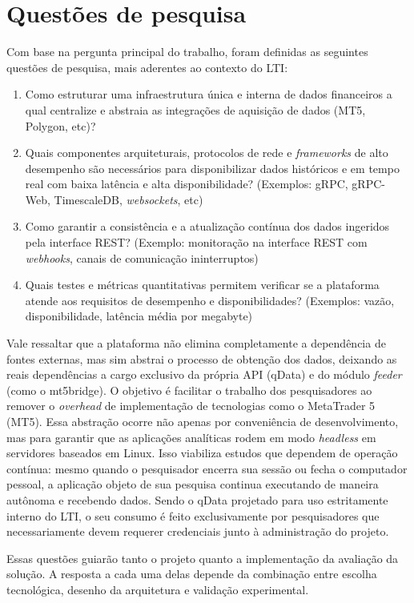 \section{Questões de pesquisa}

Com base na pergunta principal do trabalho, foram definidas as seguintes questões de pesquisa, mais aderentes ao contexto do LTI:
\begin{enumerate}
    \item Como estruturar uma infraestrutura única e interna de dados financeiros a qual centralize e abstraia as integrações de aquisição de dados (MT5, Polygon, etc)?
    \item Quais componentes arquiteturais, protocolos de rede e \textit{frameworks} de alto desempenho são necessários para disponibilizar dados históricos e em tempo real com baixa latência e alta disponibilidade? (Exemplos: gRPC, gRPC-Web, TimescaleDB, \textit{websockets}, etc)
    \item Como garantir a consistência e a atualização contínua dos dados ingeridos pela interface REST? (Exemplo: monitoração na interface REST com \textit{webhooks}, canais de comunicação ininterruptos)
    \item Quais testes e métricas quantitativas permitem verificar se a plataforma atende aos requisitos de desempenho e disponibilidades? (Exemplos: vazão, disponibilidade, latência média por megabyte)
\end{enumerate}

Vale ressaltar que a plataforma não elimina completamente a dependência de fontes externas, mas sim abstrai o processo de obtenção dos dados, deixando as reais dependências a cargo exclusivo da própria API (qData) e do módulo \textit{feeder} (como o mt5bridge). O objetivo é facilitar o trabalho dos pesquisadores ao remover o \textit{overhead} de implementação de tecnologias como o MetaTrader 5 (MT5). Essa abstração ocorre não apenas por conveniência de desenvolvimento, mas para garantir que as aplicações analíticas rodem em modo \textit{headless} em servidores baseados em Linux. Isso viabiliza estudos que dependem de operação contínua: mesmo quando o pesquisador encerra sua sessão ou fecha o computador pessoal, a aplicação objeto de sua pesquisa continua executando de maneira autônoma e recebendo dados. Sendo o qData projetado para uso estritamente interno do LTI, o seu consumo é feito exclusivamente por pesquisadores que necessariamente devem requerer credenciais junto à administração do projeto.

Essas questões guiarão tanto o projeto quanto a implementação da avaliação da solução. A resposta a cada uma delas depende da combinação entre escolha tecnológica, desenho da arquitetura e validação experimental.

